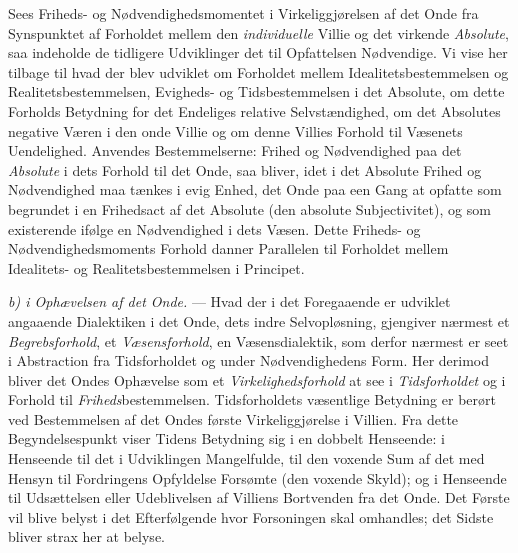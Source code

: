 Sees Friheds- og Nødvendighedsmomentet i Virkeliggjørelsen af det Onde fra
Synspunktet af Forholdet mellem den \emph{individuelle} Villie og det virkende
\emph{Absolute}, saa indeholde de tidligere Udviklinger det til Opfattelsen
Nødvendige. Vi vise her tilbage til hvad der blev udviklet om Forholdet mellem
Idealitetsbestemmelsen og Realitetsbestemmelsen, Evigheds- og Tidsbestemmelsen i
det Absolute, om dette Forholds Betydning for det Endeliges relative
Selvstændighed, om det Absolutes negative Væren i den onde Villie og om denne
Villies Forhold til Væsenets Uendelighed. Anvendes Bestemmelserne: Frihed og
Nødvendighed paa det \emph{Absolute} i dets Forhold til det Onde, saa bliver,
idet i det
 Absolute Frihed og Nødvendighed maa tænkes i evig Enhed, det Onde paa een Gang
at opfatte som begrundet i en Frihedsact af det Absolute (den absolute
Subjectivitet), og som existerende ifølge en Nødvendighed i dets Væsen. Dette
Friheds- og Nødvendighedsmoments Forhold danner Parallelen til Forholdet mellem
Idealitets- og Realitetsbestemmelsen i Principet.

\emph{b) i Ophævelsen af det Onde.} --- Hvad der i det Foregaaende er udviklet
angaaende Dialektiken i det Onde, dets indre Selvopløsning, gjengiver nærmest et
\emph{Begrebsforhold}, et \emph{Væsensforhold}, en Væsensdialektik, som derfor
nærmest er seet i Abstraction fra Tidsforholdet og under Nødvendighedens Form.
Her derimod bliver det Ondes Ophævelse som et \emph{Virkelighedsforhold} at see i
\emph{Tidsforholdet} og i Forhold til \emph{Friheds}bestemmelsen. Tidsforholdets
væsentlige Betydning er berørt ved Bestemmelsen af det Ondes første
Virkeliggjørelse i Villien. Fra dette Begyndelsespunkt viser Tidens Betydning sig
i en dobbelt Henseende: i Henseende til det i Udviklingen Mangelfulde, til den
voxende Sum af det med Hensyn til Fordringens Opfyldelse Forsømte (den voxende
Skyld); og i Henseende til Udsættelsen eller Udeblivelsen af Villiens Bortvenden
fra det Onde. Det Første vil blive belyst i det Efterfølgende hvor Forsoningen
skal omhandles; det Sidste bliver strax her at belyse.

